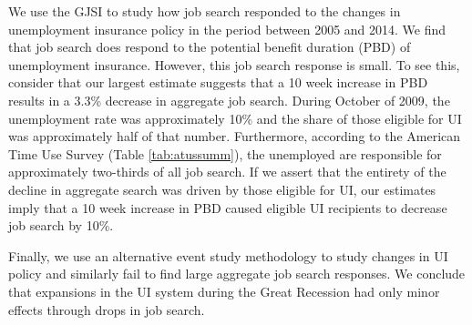\documentclass[12pt]{article}
\begin{document}
\begin{spacing}{2}
We use the GJSI to study how job search responded to the changes in unemployment insurance policy in the period between 2005 and 2014. We find that job search does respond to the potential benefit duration (PBD) of unemployment insurance. However, this job search response is small. To see this, consider that our largest estimate suggests that a 10 week increase in PBD results in a 3.3\% decrease in aggregate job search. During October of 2009, the unemployment rate was approximately 10\% and the share of those eligible for UI was approximately half of that number. Furthermore, according to the American Time Use Survey (Table \ref{tab:atussumm}), the unemployed are responsible for approximately two-thirds of all job search. If we assert that the entirety of the decline in aggregate search was driven by those eligible for UI, our estimates imply that a 10 week increase in PBD caused eligible UI recipients to decrease job search by 10\%.

Finally, we use an alternative event study methodology to study changes in UI policy and similarly fail to find large aggregate job search responses. We conclude that expansions in the UI system during the Great Recession had only minor effects through drops in job search.





\newpage





\newpage


\end{spacing}
\end{document}

